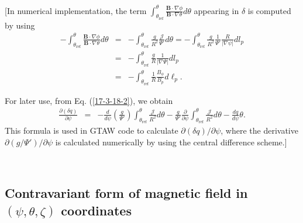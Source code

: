 \documentclass{article}
\newcommand{\tmop}[1]{\ensuremath{\operatorname{#1}}}
\begin{document}
[In numerical implementation, the term $\int_{\theta_{\tmop{ref}}}^{\theta}
\frac{\mathbf{B} \cdot \nabla \phi}{\mathbf{B} \cdot \nabla \theta} d \theta$
appearing in $\delta$ is computed by using
\begin{eqnarray}
  - \int_{\theta_{\tmop{ref}}}^{\theta} \frac{\mathbf{B} \cdot \nabla
  \phi}{\mathbf{B} \cdot \nabla \theta} d \theta & = & -
  \int_{\theta_{\tmop{ref}}}^{\theta}  \frac{g}{R^2} 
  \frac{\mathcal{J}}{\Psi'} d \theta = - \int_{\theta_{\tmop{ref}}}^{\theta} 
  \frac{g}{R^2}  \frac{1}{\Psi'} \frac{R}{| \nabla \psi |} d l_p \nonumber\\
  & = & - \int_{\theta_{\tmop{ref}}}^{\theta}  \frac{g}{R}  \frac{1}{| \nabla
  \Psi |} d l_p \nonumber\\
  & = & - \int_{\theta_{\tmop{ref}}}^{\theta}  \frac{1}{R} 
  \frac{B_{\phi}}{B_p} d \ell_p . 
\end{eqnarray}


For later use, from Eq. (\ref{17-3-18-2}), we obtain
\begin{eqnarray}
  \frac{\partial (\delta q)}{\partial \psi} & = & - \frac{d}{d \psi} \left(
  \frac{g}{\Psi'} \right) \int_{\theta_{\tmop{ref}}}^{\theta}
  \frac{\mathcal{J}}{R^2} d \theta - \frac{g}{\Psi'}  \frac{\partial}{\partial
  \psi} \int_{\theta_{\tmop{ref}}}^{\theta} \frac{\mathcal{J}}{R^2} d \theta -
  \frac{d q}{d \psi} \theta .  \label{6-25-a1}
\end{eqnarray}
This formula is used in GTAW code to calculate $\partial (\delta q) / \partial
\psi$, where the derivative $\partial (g / \Psi') / \partial \psi$ is
calculated numerically by using the central difference scheme.]

\

\subsection{ \label{6-25-4}Contravariant form of magnetic field in $(\psi,
\theta, \zeta)$ coordinates}
\end{document}
